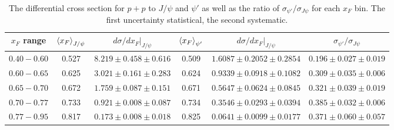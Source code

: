 \documentclass[reprint,aps,unsortedaddress,superscriptaddress,prd,floatfix,showpacs,linenumbers]{revtex4-2}
\begin{document}
\begin{table}[ht]
	\caption{The differential cross section for $p+p$ to $J/\psi$ and $\psi'$  as well as the ratio of
		$\sigma_{\psi'}/\sigma_{J\psi}$ for each $x_F$ bin. The first uncertainty  statistical, the second systematic. }
	\label{tab:pp_cs_xF}
	\begin{tabular}{c|ccccc}
		\hline
		$x_F$ range & $\expval{x_F}_{J/\psi}$ & $\left.d\sigma/dx_F\right|_{J/\psi}$ & $\expval{x_F}_{\psi'}$ & $\left.d\sigma/dx_F\right|_{J/\psi}$ & $\sigma_{\psi'}/\sigma_{J\psi}$ \\ \hline
		$0.40-0.60$ & 0.527                   & $8.219\pm0.458\pm0.616$              & 0.509                  & $1.6087\pm0.2052\pm0.2854$           & $0.196\pm0.027\pm0.019$         \\
		$0.60-0.65$ & 0.625                   & $3.021\pm0.161\pm0.283$              & 0.624                  & $0.9339\pm0.0918\pm0.1082$           & $0.309\pm0.035\pm0.006$         \\
		$0.65-0.70$ & 0.672                   & $1.759\pm0.087\pm0.151$              & 0.671                  & $0.5647\pm0.0624\pm0.0845$           & $0.321\pm0.039\pm0.019$         \\
		$0.70-0.77$ & 0.733                   & $0.921\pm0.008\pm0.087$              & 0.734                  & $0.3546\pm0.0293\pm0.0394$           & $0.385\pm0.032\pm0.006$         \\
		$0.77-0.95$ & 0.817                   & $0.173\pm0.008\pm0.018$              & 0.825                  & $0.0641\pm0.0099\pm0.0177$           & $0.371\pm0.060\pm0.057$         \\ \hline
	\end{tabular}
\end{table}
\end{document}
